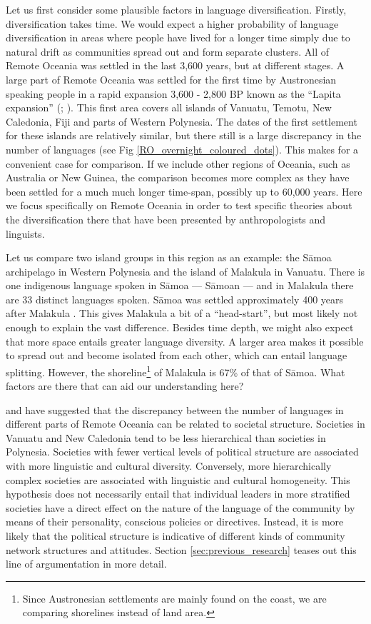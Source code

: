 \documentclass[a4paper,10pt]{article} %
\begin{document}
Let us first consider some plausible factors in language diversification. Firstly, diversification takes time. We would expect a higher probability of language diversification in areas where people have lived for a longer time simply due to natural drift as communities spread out and form separate clusters. All of Remote Oceania was settled in the last 3,600 years, but at different stages. A large part of Remote Oceania was settled for the first time by Austronesian speaking people in a rapid expansion 3,600 - 2,800 BP known as the ``Lapita expansion'' (\citet[106-7]{bellwood2006austronesians}; \citet[137]{rieth_cochrane_2018}). This first area covers all islands of Vanuatu, Temotu, New Caledonia, Fiji and parts of Western Polynesia. The dates of the first settlement for these islands are relatively similar, but there still is a large discrepancy in the number of languages (see Fig \ref{RO_overnight_coloured_dots}). This makes for a convenient case for comparison. If we include other regions of Oceania, such as Australia or New Guinea, the comparison becomes more complex as they have been settled for a much much longer time-span, possibly up to 60,000 years. Here we focus specifically on Remote Oceania in order to test specific theories about the diversification there that have been presented by anthropologists and linguists.

Let us compare two island groups in this region as an example: the S\={a}moa archipelago in Western Polynesia and the island of Malakula in Vanuatu. There is one indigenous language spoken in  S\={a}moa ---  S\={a}moan --- and in Malakula there are 33 distinct languages spoken. S\={a}moa was settled approximately 400 years after Malakula \citep[137-8]{rieth_cochrane_2018}. This gives Malakula a bit of a ``head-start'', but most likely not enough to explain the vast difference. Besides time depth, we might also expect that more space entails greater language diversity. A larger area makes it possible to spread out and become isolated from each other, which can entail language splitting. However, the shoreline\footnote{Since Austronesian settlements are mainly found on the coast, we are comparing shorelines instead of land area.} of Malakula is 67\% of that of S\={a}moa. What factors are there that can aid our understanding here?

\citet{turner1884} and \citet{pawley81,pawley2007} have suggested that the discrepancy between the number of languages in different parts of Remote Oceania can be related to societal structure. Societies in Vanuatu and New Caledonia tend to be less hierarchical than societies in Polynesia. Societies with fewer vertical levels of political structure are associated with more linguistic and cultural diversity. Conversely, more hierarchically complex societies are associated with linguistic and cultural homogeneity. This hypothesis does not necessarily entail that individual leaders in more stratified societies have a direct effect on the nature of the language of the community by means of their personality, conscious policies or directives. Instead, it is more likely that the political structure is indicative of different kinds of community network structures and attitudes. Section \ref{sec:previous_research} teases out this line of argumentation in more detail.
\end{document}
